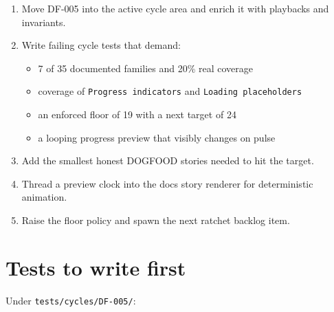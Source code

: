 \begin{enumerate}
\def\labelenumi{\arabic{enumi}.}
\tightlist
\item
  Move DF-005 into the active cycle area and enrich it with playbacks and invariants.
\item
  Write failing cycle tests that demand:

  \begin{itemize}
  \tightlist
  \item
    7 of 35 documented families and 20\% real coverage
  \item
    coverage of \texttt{P\allowbreak{}r\allowbreak{}o\allowbreak{}g\allowbreak{}r\allowbreak{}e\allowbreak{}s\allowbreak{}s\allowbreak{} \allowbreak{}i\allowbreak{}n\allowbreak{}d\allowbreak{}i\allowbreak{}c\allowbreak{}a\allowbreak{}t\allowbreak{}o\allowbreak{}r\allowbreak{}s} and \texttt{L\allowbreak{}o\allowbreak{}a\allowbreak{}d\allowbreak{}i\allowbreak{}n\allowbreak{}g\allowbreak{} \allowbreak{}p\allowbreak{}l\allowbreak{}a\allowbreak{}c\allowbreak{}e\allowbreak{}h\allowbreak{}o\allowbreak{}l\allowbreak{}d\allowbreak{}e\allowbreak{}r\allowbreak{}s}
  \item
    an enforced floor of 19 with a next target of 24
  \item
    a looping progress preview that visibly changes on pulse
  \end{itemize}
\item
  Add the smallest honest DOGFOOD stories needed to hit the target.
\item
  Thread a preview clock into the docs story renderer for deterministic animation.
\item
  Raise the floor policy and spawn the next ratchet backlog item.
\end{enumerate}

\section{Tests to write first}\label{record-067-tests-to-write-first}

Under \texttt{t\allowbreak{}e\allowbreak{}s\allowbreak{}t\allowbreak{}s\allowbreak{}/\allowbreak{}c\allowbreak{}y\allowbreak{}c\allowbreak{}l\allowbreak{}e\allowbreak{}s\allowbreak{}/\allowbreak{}D\allowbreak{}F\allowbreak{}-\allowbreak{}0\allowbreak{}0\allowbreak{}5\allowbreak{}/}:

